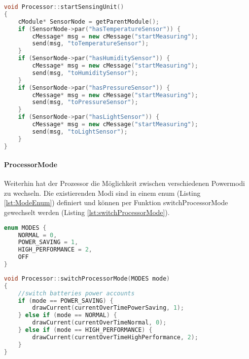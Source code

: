 \begin{lstlisting}[language=C++, label=lst:startSensingUnit, caption=startSensingUnit()]
void Processor::startSensingUnit()
{
    cModule* SensorNode = getParentModule();
    if (SensorNode->par("hasTemperatureSensor")) {
        cMessage* msg = new cMessage("startMeasuring");
        send(msg, "toTemperatureSensor");
    }
    if (SensorNode->par("hasHumiditySensor")) {
        cMessage* msg = new cMessage("startMeasuring");
        send(msg, "toHumiditySensor");
    }
    if (SensorNode->par("hasPressureSensor")) {
        cMessage* msg = new cMessage("startMeasuring");
        send(msg, "toPressureSensor");
    }
    if (SensorNode->par("hasLightSensor")) {
        cMessage* msg = new cMessage("startMeasuring");
        send(msg, "toLightSensor");
    }
}
\end{lstlisting}

\paragraph{ProcessorMode}

Weiterhin hat der Prozessor die Möglichkeit zwischen verschiedenen Powermodi zu wechseln. Die existierenden Modi sind in einem enum (Listing \ref{lst:ModeEnum}) definiert und können per Funktion switchProcessorMode gewechselt werden (Listing \ref{lst:switchProcessorMode}).

\begin{lstlisting}[language=C++, label=lst:ModeEnum, caption=enum MODES]
enum MODES { 
	NORMAL = 0, 
	POWER_SAVING = 1, 
	HIGH_PERFORMANCE = 2, 
	OFF 
}
\end{lstlisting}

\begin{lstlisting}[language=C++, label=lst:switchProcessorMode, caption=switchProcessorMode()]
void Processor::switchProcessorMode(MODES mode)
{
    //switch batteries power accounts
    if (mode == POWER_SAVING) {
        drawCurrent(currentOverTimePowerSaving, 1);
    } else if (mode == NORMAL) {
        drawCurrent(currentOverTimeNormal, 0);
    } else if (mode == HIGH_PERFORMANCE) {
        drawCurrent(currentOverTimeHighPerformance, 2);
    }
}
\end{lstlisting}

